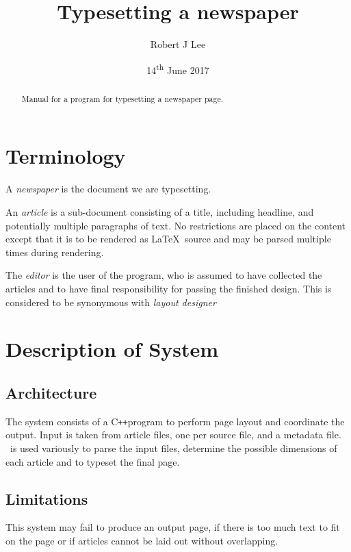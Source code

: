 \documentclass[a4paper]{scrartcl}
\newcommand{\cpp}{\mbox{C\texttt{++}}}
\begin{document}
\title{Typesetting a newspaper}
\author{Robert J Lee}
\date{14\textsuperscript{th} June 2017}

\maketitle

\begin{abstract} 
  Manual for a program for typesetting a newspaper page.
\end{abstract}


\section{Terminology}

A \textit{newspaper} is the document we are typesetting.

An \textit{article} is a sub-document consisting of a title, including
headline, and potentially multiple paragraphs of text. No restrictions
are placed on the content except that it is to be rendered as
\LaTeX\ source and may be parsed multiple times during rendering.

The \textit{editor} is the user of the program, who is assumed to have
collected the articles and to have final responsibility for passing
the finished design. This is considered to be synonymous with
\textit{layout designer}


\section{Description of System}

\subsection{Architecture}

The system consists of a \cpp program to perform page layout and
coordinate the output. Input is taken from article files, one per
source file, and a metadata file. \LaTeXe\ is used variously to parse
the input files, determine the possible dimensions of each article and
to typeset the final page.


\subsection{Limitations}

This system may fail to produce an output page, if there is too much
text to fit on the page or if articles cannot be laid out without
overlapping.
\end{document}
